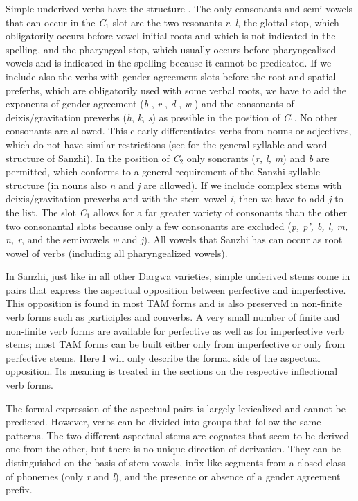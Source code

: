 Simple underived verbs have the structure . The only consonants and semi-vowels that can occur in the \textit{C$_{1}$} slot are the two resonants \textit{r}, \textit{l}, the glottal stop, which obligatorily occurs before vowel-initial roots and which is not indicated in the spelling, and the pharyngeal stop, which usually occurs before pharyngealized vowels and is indicated in the spelling because it cannot be predicated. If we include also the verbs with gender agreement slots before the root and spatial preferbs, which are obligatorily used with some verbal roots, we have to add the exponents of gender agreement (\textit{b}-, \textit{r}-, \textit{d}-, \textit{w}-) and the consonants of deixis/gravitation preverbs (\textit{h}, \textit{k}, \textit{s}) as possible in the position of \textit{C$_{1}$}. No other consonants are allowed. This clearly differentiates verbs from nouns or adjectives, which do not have similar restrictions (see  for the general syllable and word structure of Sanzhi). In the position of \textit{C$_{2}$} only sonorants (\textit{r, l, m}) and \textit{b} are permitted, which conforms to a general requirement of the Sanzhi syllable structure (in nouns also \textit{n} and \textit{j} are allowed). If we include complex stems with deixis/gravitation preverbs and with the stem vowel \textit{i}, then we have to add \textit{j} to the list. The slot \textit{C$_{1}$} allows for a far greater variety of consonants than the other two consonantal slots because only a few consonants are excluded (\textit{p, p', b, l, m, n, r}, and the semivowels \textit{w} and \textit{j}). All vowels that Sanzhi has can occur as root vowel of verbs (including all pharyngealized vowels).

In Sanzhi, just like in all other Dargwa varieties, simple underived stems come in pairs that express the aspectual opposition between perfective and imperfective. This opposition is found in most TAM forms and is also preserved in non-finite verb forms such as participles and converbs. A very small number of finite and non-finite verb forms are available for perfective as well as for imperfective verb stems; most TAM forms can be built either only from imperfective or only from perfective stems. Here I will only describe the formal side of the aspectual opposition. Its meaning is treated in the sections on the respective inflectional verb forms.

The formal expression of the aspectual pairs is largely lexicalized and cannot be predicted. However, verbs can be divided into groups that follow the same patterns. The two different aspectual stems are cognates that seem to be derived one from the other, but there is no unique direction of derivation. They can be distinguished on the basis of stem vowels, infix-like segments from a closed class of phonemes (only \textit{r} and \textit{l}), and the presence or absence of a gender agreement prefix.

